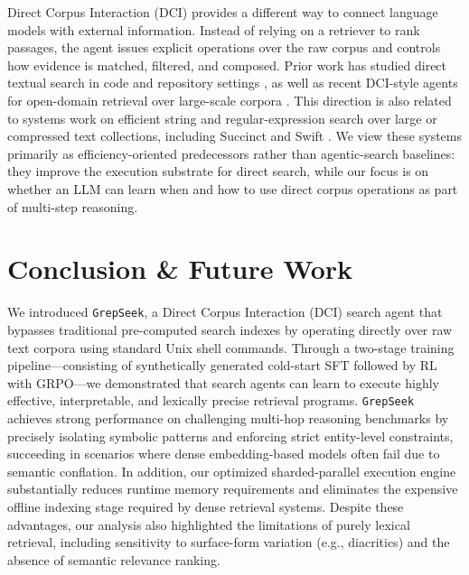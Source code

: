 \documentclass{llmxive}
\providecommand{\ourmethod}{\texttt{GrepSeek}\xspace}
\begin{document}
Direct Corpus Interaction (DCI) provides a different way to connect language models with external information. Instead of relying on a retriever to rank passages, the agent issues explicit operations over the raw corpus and controls how evidence is matched, filtered, and composed. Prior work has studied direct textual search in code and repository settings \citep{10.1145/3565971,wang2026grepragempiricalstudyoptimization}, as well as recent DCI-style agents for open-domain retrieval over large-scale corpora \citep{sen2026grepneedagentharnesses,dci-agent, subramanian2025keywordsearchneedachieving}. This direction is also related to systems work on efficient string and regular-expression search over large or compressed text collections, including Succinct and Swift \citep{188994,NAVARRO2003423}. We view these systems primarily as efficiency-oriented predecessors rather than agentic-search baselines: they improve the execution substrate for direct search, while our focus is on whether an LLM can learn when and how to use direct corpus operations as part of multi-step reasoning.






\section{Conclusion \& Future Work}

We introduced \ourmethod{}, a Direct Corpus Interaction (DCI) search agent that bypasses traditional pre-computed search indexes by operating directly over raw text corpora using standard Unix shell commands. Through a two-stage training pipeline---consisting of synthetically generated cold-start SFT followed by RL with GRPO---we demonstrated that search agents can learn to execute highly effective, interpretable, and lexically precise retrieval programs. \ourmethod{} achieves strong performance on challenging multi-hop reasoning benchmarks by precisely isolating symbolic patterns and enforcing strict entity-level constraints, succeeding in scenarios where dense embedding-based models often fail due to semantic conflation. In addition, our optimized sharded-parallel execution engine substantially reduces runtime memory requirements and eliminates the expensive offline indexing stage required by dense retrieval systems. Despite these advantages, our analysis also highlighted the limitations of purely lexical retrieval, including sensitivity to surface-form variation (e.g., diacritics) and the absence of semantic relevance ranking. 
\end{document}

